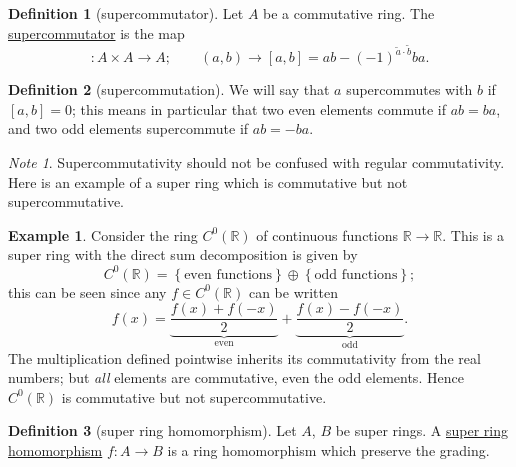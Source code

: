 \documentclass[a4paper]{report}
\newcommand{\R}{\mathbb{R}}
\newcommand{\defn}[1]{\ul{#1}}
\theoremstyle{definition}
\newtheorem{definition}{Definition}[section]
\newtheorem{example}{Example}[section]
\theoremstyle{plain}
\theoremstyle{remark}
\newtheorem{note}{Note}[section]
\begin{document}
\begin{definition}[supercommutator]
  \label{def:supercommutator}
  Let $A$ be a commutative ring. The \defn{supercommutator} is the map
  \begin{equation*}
    [\cdot ,\cdot ]\colon A \times A \to A;\qquad (a,b) \to [a,b] = ab - (-1)^{\tilde{a}\cdot \tilde{b}} ba.
  \end{equation*}
\end{definition}

\begin{definition}[supercommutation]
  \label{def:supercommutes}
  We will say that $a$ supercommutes with $b$ if $[a,b] = 0$; this means in particular that two even elements commute if $ab = ba$, and two odd elements supercommute if $ab = -ba$.
\end{definition}
\begin{note}
  Supercommutativity should not be confused with regular commutativity. Here is an example of a super ring which is commutative but not supercommutative.
\end{note}
\begin{example}
  Consider the ring $C^{0}(\R)$ of continuous functions $\R \to \R$. This is a super ring with the direct sum decomposition is given by
  \begin{equation*}
    C^{0}(\R) = \left\{ \text{even functions} \right\} \oplus \left\{ \text{odd functions} \right\};
  \end{equation*}
  this can be seen since any $f \in C^{0}(\R)$ can be written
  \begin{equation*}
    f(x) = \underbrace{\frac{f(x) + f(-x)}{2}}_{\text{even}} + \underbrace{\frac{f(x) - f(-x)}{2}}_{\text{odd}}.
  \end{equation*}
  The multiplication defined pointwise inherits its commutativity from the real numbers; but \emph{all} elements are commutative, even the odd elements. Hence $C^{0}(\R)$ is commutative but not supercommutative.
\end{example}

\begin{definition}[super ring homomorphism]
  \label{def:superringhomomorphism}
  Let $A$, $B$ be super rings. A \defn{super ring homomorphism} $f\colon A \to B$ is a ring homomorphism which preserve the grading.
\end{definition}
\end{document}
